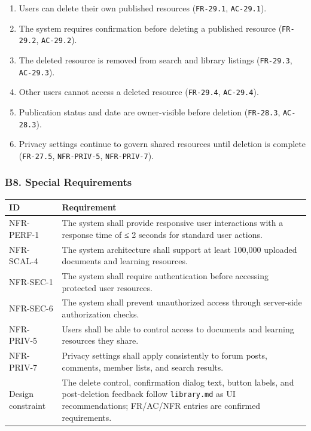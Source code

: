 \documentclass[12pt]{article}
\renewcommand{\baselinestretch}{1.5}
\begin{document}
\begin{enumerate}
\item Users can delete their own published resources (\texttt{FR-29.1}, \texttt{AC-29.1}).
\item The system requires confirmation before deleting a published resource (\texttt{FR-29.2}, \texttt{AC-29.2}).
\item The deleted resource is removed from search and library listings (\texttt{FR-29.3}, \texttt{AC-29.3}).
\item Other users cannot access a deleted resource (\texttt{FR-29.4}, \texttt{AC-29.4}).
\item Publication status and date are owner-visible before deletion (\texttt{FR-28.3}, \texttt{AC-28.3}).
\item Privacy settings continue to govern shared resources until deletion is complete (\texttt{FR-27.5}, \texttt{NFR-PRIV-5}, \texttt{NFR-PRIV-7}).
\end{enumerate}
\par\medskip

\hypertarget{sec:b8-special-requirements}{}
\subsubsection*{B8. Special Requirements}
\par\medskip

\begingroup
\small
\renewcommand{\baselinestretch}{1.0}\selectfont
\renewcommand{\arraystretch}{1.15}
\setlength{\tabcolsep}{6pt}
\begin{longtable}{|>{\raggedright\arraybackslash}p{}|>{\raggedright\arraybackslash}p{}|}
\hline
\textbf{ID} & \textbf{Requirement} \\ \hline
\endhead
NFR-PERF-1 & The system shall provide responsive user interactions with a response time of ≤ 2 seconds for standard user actions. \\ \hline
NFR-SCAL-4 & The system architecture shall support at least 100,000 uploaded documents and learning resources. \\ \hline
NFR-SEC-1 & The system shall require authentication before accessing protected user resources. \\ \hline
NFR-SEC-6 & The system shall prevent unauthorized access through server-side authorization checks. \\ \hline
NFR-PRIV-5 & Users shall be able to control access to documents and learning resources they share. \\ \hline
NFR-PRIV-7 & Privacy settings shall apply consistently to forum posts, comments, member lists, and search results. \\ \hline
Design constraint & The delete control, confirmation dialog text, button labels, and post-deletion feedback follow \texttt{library.md} as UI recommendations; FR/AC/NFR entries are confirmed requirements. \\ \hline
\end{longtable}
\endgroup
\par\medskip
\end{document}
